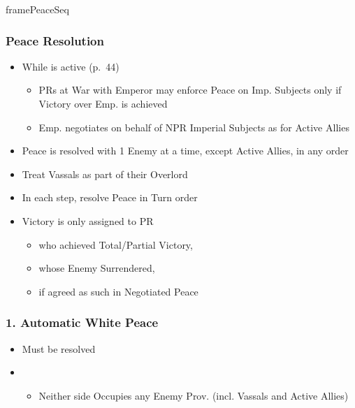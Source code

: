 \documentclass[10pt]{article}
\newlength{\fhPeaceSeq} \setlength\fhPeaceSeq{26.5\baselineskip}
\begin{document}
\begin{dynamiccontents*}{framePeaceSeq}\begin{eubox}{\fhPeaceSeq}
	\begin{multicols}{3}
		\subsubsection*{Peace Resolution }
		\begin{itemize}
			\item While  is active (p.~44)
			\begin{itemize}
				\item PRs at War with Emperor may enforce Peace on Imp. Subjects only if Victory over Emp. is achieved
				\item Emp. negotiates on behalf of NPR Imperial Subjects as for Active Allies
			\end{itemize}
			\item Peace is resolved with 1 Enemy at a time, except Active Allies, in any order
			\item Treat Vassals as part of their Overlord
			\item In each step, resolve Peace in Turn order
			\item Victory is only assigned to PR
			\begin{itemize}
				\item who achieved Total/Partial Victory, 
				\item whose Enemy Surrendered, 
				\item if agreed as such in Negotiated Peace
			\end{itemize}
		\end{itemize}

		\subsubsection*{1. Automatic White Peace}
		\begin{itemize}
			\item Must be resolved
			\item {}
			\begin{itemize}
				\item Neither side Occupies any Enemy Prov. (incl. Vassals and Active Allies)
			\end{itemize}
		\end{itemize}


\end{multicols}
\end{eubox}
\end{dynamiccontents*}
\end{document}
